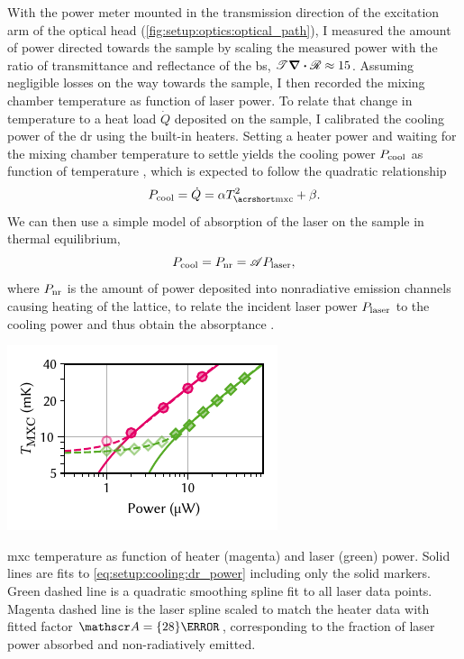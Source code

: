 With the power meter mounted in the transmission direction of the excitation arm of the optical head (\cf \cref{fig:setup:optics:optical_path}), I measured the amount of power directed towards the sample by scaling the measured power with the ratio of transmittance and reflectance of the \gls{bs}, $\mathscr{T}\div\mathscr{R}\approx\num{15}$.
Assuming negligible losses on the way towards the sample, I then recorded the mixing chamber temperature as function of laser power.
To relate that change in temperature to a heat load $\dot{Q}$ deposited on the sample, I calibrated the cooling power of the \gls{dr} using the built-in heaters.
Setting a heater power and waiting for the mixing chamber temperature to settle yields the cooling power $P_{\mathrm{cool}}$ as function of temperature \Tmxc, which is expected to follow the quadratic relationship~\cite{DeWaele2011}
\begin{equation}\label{eq:setup:cooling:dr_power}
    P_{\mr{cool}} = \dot{Q} = \alpha \Tmxc^2 + \beta.
\end{equation}
We can then use a simple model of absorption of the laser on the sample in thermal equilibrium,
\begin{equation}\label{eq:setup:cooling:absorptance}
    P_{\mathrm{cool}} = P_{\mathrm{nr}} = \mathscr{A} P_{\mathrm{laser}},
\end{equation}
where $P_{\mathrm{nr}}$ is the amount of power deposited into nonradiative emission channels causing heating of the lattice, to relate the incident laser power $P_{\mathrm{laser}}$ to the cooling power and thus obtain the absorptance \absorptance.

\begin{marginfigure}[*-15]
    \centering
    \includegraphics{img/pdf/setup/laser_heating}
    \caption[]{
        \Acrlong{mxc} temperature as function of heater (magenta) and laser (green) power.
        Solid lines are fits to \cref{eq:setup:cooling:dr_power} including only the solid markers.
        Green dashed line is a quadratic smoothing spline fit to all laser data points.
        Magenta dashed line is the laser spline scaled to match the heater data with fitted factor $\absorptance=\qty{28}{\percent}$, corresponding to the fraction of laser power absorbed and non-radiatively emitted.
    }
    \label{fig:setup:cooling:laser}
\end{marginfigure}

